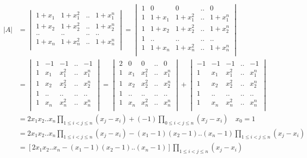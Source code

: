 \documentclass[12pt,a4paper]{ctexart}
\begin{document}
\begin{align*}
    |A| &= \begin{vmatrix}
        1 + x_1 & 1 + x_1^2 & .. & 1+x_1^n \\
        1 + x_2 & 1 + x_2^2 & .. & 1+x_2^n \\
        .. & .. & .. & .. \\
        1 + x_n & 1 + x_n^2 & .. & 1+x_n^n \\
    \end{vmatrix} =     
    \begin{vmatrix}
        1 & 0 & 0 & .. & 0 \\
        1 & 1 + x_1 & 1 + x_1^2 & .. & 1+x_1^n \\
        1 & 1 + x_2 & 1 + x_2^2 & .. & 1+x_2^n \\
        1 & .. & .. & .. & .. \\
        1 & 1 + x_n & 1 + x_n^2 & .. & 1+x_n^n \\
    \end{vmatrix} \\
    & =     \begin{vmatrix}
        1 & -1 & -1 & .. & -1 \\
        1 &  x_1 & x_1^2 & .. & x_1^n \\
        1 &  x_2 &  x_2^2 & .. & x_2^n \\
        1 & .. & .. & .. & .. \\
        1 &  x_n &  x_n^2 & .. & x_n^n \\
    \end{vmatrix} = \begin{vmatrix}
        2 & 0 & 0 & .. & 0 \\
        1 &  x_1 & x_1^2 & .. & x_1^n \\
        1 &  x_2 &  x_2^2 & .. & x_2^n \\
        1 & .. & .. & .. & .. \\
        1 &  x_n &  x_n^2 & .. & x_n^n \\
    \end{vmatrix} + \begin{vmatrix}
        -1 & -1 & -1 & .. & -1 \\
        1 &  x_1 & x_1^2 & .. & x_1^n \\
        1 &  x_2 &  x_2^2 & .. & x_2^n \\
        1 & .. & .. & .. & .. \\
        1 &  x_n &  x_n^2 & .. & x_n^n \\
    \end{vmatrix} \\
    &= 2x_1x_2..x_n \prod_{1 \le i < j \le n}\left( x_j - x_i\right) + (-1)\prod_{0 \le i < j \le n}(x_j - x_i) \quad x_0 = 1 \\
    &= 2x_1x_2..x_n \prod_{1 \le i < j \le n}\left( x_j - x_i\right) - (x_1-1)(x_2-1)..(x_n-1)\prod_{1 \le i < j \le n}\left(x_j - x_i\right) \\
    &= \left[ 2x_1x_2..x_n - (x_1-1)(x_2-1)..(x_n-1)\right]\prod_{1 \le i < j \le n}\left( x_j - x_i\right)
\end{align*}
\end{document}
